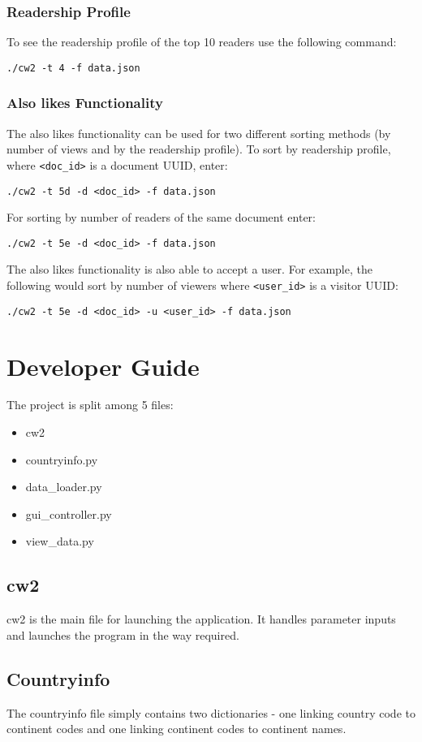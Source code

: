 \documentclass[11pt]{report}
\begin{document}
\subsection{Readership Profile}
To see the readership profile of the top 10 readers use the following command:
\begin{lstlisting}
./cw2 -t 4 -f data.json
\end{lstlisting}
\subsection{Also likes Functionality}
The also likes functionality can be used for two different sorting methods (by number of views and by the readership profile). To sort by readership profile, where \lstinline{<doc_id>} is a document UUID, enter:
\begin{lstlisting}
./cw2 -t 5d -d <doc_id> -f data.json
\end{lstlisting}
For sorting by number of readers of the same document enter:
\begin{lstlisting}
./cw2 -t 5e -d <doc_id> -f data.json
\end{lstlisting}
The also likes functionality is also able to accept a user.  For example, the following would sort by number of viewers where \lstinline{<user_id>} is a visitor UUID:
\begin{lstlisting}
./cw2 -t 5e -d <doc_id> -u <user_id> -f data.json
\end{lstlisting}

\chapter{Developer Guide}

The project is split among 5 files:
\begin{itemize}
\item{cw2}
\item{countryinfo.py}
\item{data\_loader.py}
\item{gui\_controller.py}
\item{view\_data.py}
\end{itemize}

\section{cw2}
cw2 is the main file for launching the application.  It handles parameter inputs and launches the program in the way required.
\section{Countryinfo}
The countryinfo file simply contains two dictionaries - one linking country code to continent codes and one linking continent codes to continent names.
\end{document}
